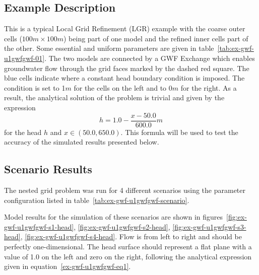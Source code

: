 \subsection{Example Description}
This is a typical Local Grid Refinement (LGR) example with the coarse outer cells ($100 m \times 100 m$) being part of one model and the refined inner cells part of the other. Some essential and uniform parameters are given in table~\ref{tab:ex-gwf-u1gwfgwf-01}. The two models are connected by a GWF Exchange which enables groundwater flow through the grid faces marked by the dashed red square. The blue cells indicate where a constant head boundary condition is imposed. The condition is set to 1$m$ for the cells on the left and to 0$m$ for the right. As a result, the analytical solution of the problem is trivial and given by the expression
\begin{equation}
	h = 1.0 - \frac{x - 50.0}{600.0} m	
\label{ex-gwf-u1gwfgwf-eq1}
\end{equation}
for the head $h$ and $x \in (50.0,650.0)$. This formula will be used to test the accuracy of the simulated results presented below.
                               



\subsection{Scenario Results}

The nested grid problem was run for 4 different scenarios using the parameter configuration listed in table~\ref{tab:ex-gwf-u1gwfgwf-scenario}. 



Model results for the simulation of these scenarios are shown in figures~\ref{fig:ex-gwf-u1gwfgwf-s1-head}, \ref{fig:ex-gwf-u1gwfgwf-s2-head}, \ref{fig:ex-gwf-u1gwfgwf-s3-head}, \ref{fig:ex-gwf-u1gwfgwf-s4-head}. Flow is from left to right and should be perfectly one-dimensional. The head surface should represent a flat plane with a value of 1.0 on the left and zero on the right, following the analytical expression given in equation~\ref{ex-gwf-u1gwfgwf-eq1}. 

